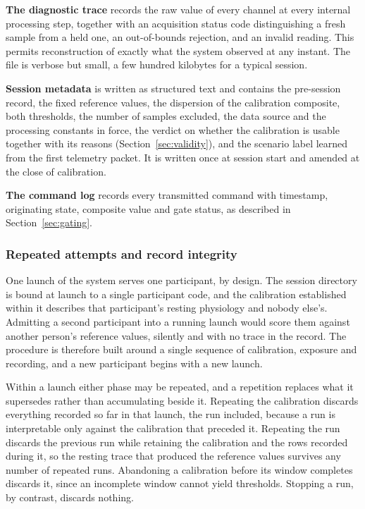 \textbf{The diagnostic trace} records the raw value of every
channel at every internal processing step, together with an
acquisition status code distinguishing a fresh sample from a held
one, an out-of-bounds rejection, and an invalid reading. This
permits reconstruction of exactly what the system observed at any
instant. The file is verbose but small, a few hundred kilobytes
for a typical session.

\textbf{Session metadata} is written as structured text and
contains the pre-session record, the fixed reference values, the
dispersion of the calibration composite, both thresholds, the
number of samples excluded, the data source and the processing
constants in force, the verdict on whether the calibration is
usable together with its reasons
(Section~\ref{sec:validity}), and the scenario label learned from
the first telemetry packet. It is written once at session start
and amended at the close of calibration.

\textbf{The command log} records every transmitted command with
timestamp, originating state, composite value and gate status,
as described in
Section~\ref{sec:gating}.

\subsubsection{Repeated attempts and record integrity}
\label{sec:integrity}

One launch of the system serves one participant, by design. The
session directory is bound at launch to a single participant code,
and the calibration established within it describes that
participant's resting physiology and nobody else's. Admitting a
second participant into a running launch would score them against
another person's reference values, silently and with no trace in
the record. The procedure is therefore built around a single
sequence of calibration, exposure and recording, and a new
participant begins with a new launch.

Within a launch either phase may be repeated, and a repetition
replaces what it supersedes rather than accumulating beside it.
Repeating the calibration discards everything recorded so far in
that launch, the run included, because a run is interpretable only
against the calibration that preceded it. Repeating the run
discards the previous run while retaining the calibration and the
rows recorded during it, so the resting trace that produced the
reference values survives any number of repeated runs. Abandoning
a calibration before its window completes discards it, since an
incomplete window cannot yield thresholds. Stopping a run, by
contrast, discards nothing.

